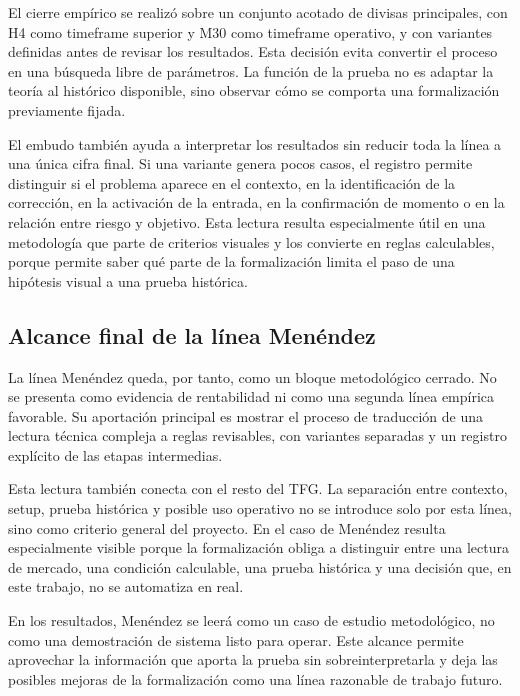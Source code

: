 El cierre emp\'irico se realiz\'o sobre un conjunto acotado de divisas
principales, con H4 como timeframe superior y M30 como timeframe operativo, y con
variantes definidas antes de revisar los resultados. Esta decisi\'on evita
convertir el proceso en una b\'usqueda libre de par\'ametros. La funci\'on de la
prueba no es adaptar la teor\'ia al hist\'orico disponible, sino observar c\'omo se
comporta una formalizaci\'on previamente fijada.

El embudo tambi\'en ayuda a interpretar los resultados sin reducir toda la
l\'inea a una \'unica cifra final. Si una variante genera pocos casos, el registro
permite distinguir si el problema aparece en el contexto, en la identificaci\'on
de la correcci\'on, en la activaci\'on de la entrada, en la confirmaci\'on de
momento o en la relaci\'on entre riesgo y objetivo. Esta lectura resulta
especialmente \'util en una metodolog\'ia que parte de criterios visuales y los
convierte en reglas calculables, porque permite saber qu\'e parte de la
formalizaci\'on limita el paso de una hip\'otesis visual a una prueba hist\'orica.

\subsection{Alcance final de la l\'inea Men\'endez}
\label{subsec:alcance-final-menendez}

La l\'inea Men\'endez queda, por tanto, como un bloque metodol\'ogico cerrado. No
se presenta como evidencia de rentabilidad ni como una segunda l\'inea emp\'irica
favorable. Su aportaci\'on principal es mostrar el proceso de traducci\'on de una
lectura t\'ecnica compleja a reglas revisables, con variantes separadas y un
registro expl\'icito de las etapas intermedias.

Esta lectura tambi\'en conecta con el resto del TFG. La separaci\'on entre
contexto, setup, prueba hist\'orica y posible uso operativo no se introduce solo
por esta l\'inea, sino como criterio general del proyecto. En el caso de
Men\'endez resulta especialmente visible porque la formalizaci\'on obliga a
distinguir entre una lectura de mercado, una condici\'on calculable, una prueba
hist\'orica y una decisi\'on que, en este trabajo, no se automatiza en real.

En los resultados, Men\'endez se leer\'a como un caso de estudio metodol\'ogico,
no como una demostraci\'on de sistema listo para operar. Este alcance permite
aprovechar la informaci\'on que aporta la prueba sin sobreinterpretarla y deja
las posibles mejoras de la formalizaci\'on como una l\'inea razonable de trabajo
futuro.

